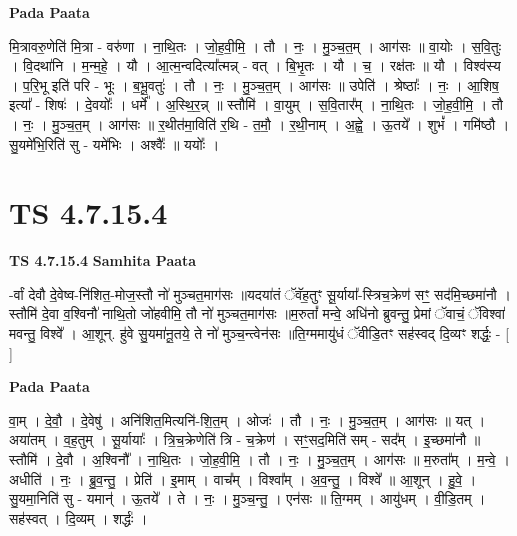 \documentclass[17pt]{extarticle}
\begin{document}
\textbf{Pada Paata} \newline

मि॒त्रावरु॒णेति॑ मि॒त्रा - वरु॑णा । ना॒थि॒तः । जो॒ह॒वी॒मि॒ । तौ । नः॒ । मु॒ञ्च॒त॒म् । आग॑सः ॥ वा॒योः । स॒वि॒तुः । वि॒दथा॑नि । म॒न्म॒हे॒ । यौ । आ॒त्म॒न्वदित्या᳚त्मन्न् - वत् । बि॒भृ॒तः । यौ । च॒ । रक्ष॑तः ॥ यौ । विश्व॑स्य । प॒रि॒भू इति॑ परि - भूः । ब॒भू॒वतुः॑ । तौ । नः॒ । मु॒ञ्च॒त॒म् । आग॑सः ॥ उपेति॑ । श्रेष्ठाः᳚ । नः॒ । आ॒शिष॒ इत्या᳚ - शिषः॑ । दे॒वयोः᳚ । धर्मे᳚ । अ॒स्थि॒र॒न्न् ॥ स्तौमि॑ । वा॒युम् । स॒वि॒तार᳚म् । ना॒थि॒तः । जो॒ह॒वी॒मि॒ । तौ । नः॒ । मु॒ञ्च॒त॒म् । आग॑सः ॥ र॒थीत॑मा॒विति॑ र॒थि - त॒मौ॒ । र॒थी॒नाम् । अ॒ह्वे॒ । ऊ॒तये᳚ । शुभं᳚ । गमि॑ष्ठौ । सु॒यमे॑भि॒रिति॑ सु - यमे॑भिः । अश्वैः᳚ ॥ ययोः᳚ ।  \newline





\section{ TS 4.7.15.4 }

\textbf{TS 4.7.15.4 } \newline
\textbf{Samhita Paata} \newline

-र्वां देवौ दे॒वेष्व-नि॑शित॒-मोज॒स्तौ नो॑ मुञ्चत॒माग॑सः ॥यदया॑तं ॅवॅह॒तुꣳ सू॒र्याया᳚-स्त्रिच॒क्रेण॑ सꣳ॒॒ सद॑मि॒च्छमा॑नौ ।स्तौमि॑ दे॒वा व॒श्विनौ॑ नाथि॒तो जो॑हवीमि॒ तौ नो॑ मुञ्चत॒माग॑सः ॥म॒रुतां᳚ मन्वे॒ अधि॑नो ब्रुवन्तु॒ प्रेमां ॅवाचं॒ ॅविश्वा॑ मवन्तु॒ विश्वे᳚ । आ॒शून्. हु॑वे सु॒यमा॑नू॒तये॒ ते नो॑ मुञ्च॒न्त्वेन॑सः ॥ति॒ग्ममायु॑धं ॅवीडि॒तꣳ सह॑स्वद् दि॒व्यꣳ शर्द्धः॒ - [  ] \newline

\textbf{Pada Paata} \newline

वा॒म् । दे॒वौ॒ । दे॒वेषु॑ । अनि॑शित॒मित्यनि॑-शि॒त॒म् । ओजः॑ । तौ । नः॒ । मु॒ञ्च॒त॒म् । आग॑सः ॥ यत् । अया॑तम् । व॒ह॒तुम् । सू॒र्यायाः᳚ । त्रि॒च॒क्रेणेति॑ त्रि - च॒क्रेण॑ । सꣳ॒॒सद॒मिति॑ सम् - सद᳚म् । इ॒च्छमा॑नौ ॥ स्तौमि॑ । दे॒वौ । अ॒श्विनौ᳚ । ना॒थि॒तः । जो॒ह॒वी॒मि॒ । तौ । नः॒ । मु॒ञ्च॒त॒म् । आग॑सः ॥ म॒रुता᳚म् । म॒न्वे॒ । अधीति॑ । नः॒ । ब्रु॒व॒न्तु॒ । प्रेति॑ । इ॒माम् । वाच᳚म् । विश्वा᳚म् । अ॒व॒न्तु॒ । विश्वे᳚ ॥ आ॒शून् । हु॒वे॒ । सु॒यमा॒निति॑ सु - यमान्॑ । ऊ॒तये᳚ । ते । नः॒ । मु॒ञ्च॒न्तु॒ । एन॑सः ॥ ति॒ग्मम् । आयु॑धम् । वी॒डि॒तम् । सह॑स्वत् । दि॒व्यम् । शर्द्धः॑ ।  \newline
\end{document}

